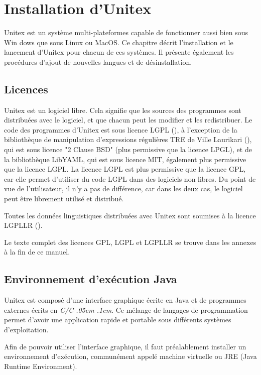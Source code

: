\chapter{Installation d'Unitex}
\label{chap-install}

Unitex est un système multi-plateformes capable de fonctionner aussi bien sous Win
dows que sous Linux ou MacOS. Ce chapitre décrit l’installation et le lancement d’Unitex
pour chacun de ces systèmes. Il présente également les procédures d’ajout de nouvelles
langues et de désinstallation.

\section{Licences}
\label{section-licences}
Unitex est un logiciel libre. Cela signifie que les sources des programmes sont distribuées avec le
logiciel, et que chacun peut les modifier et les redistribuer. Le code des programmes d’Unitex est
sous licence LGPL (\cite{LGPL}), à l’exception de la bibliothèque de manipulation d’expressions
régulières TRE de Ville Laurikari (\cite{TRE}), qui est sous licence "2 Clause BSD" (plus permissive que la licence LPGL), et
de la bibliothèque LibYAML, qui est sous licence MIT, également plus permissive que la licence LGPL.
La licence LGPL est plus permissive que la licence GPL, car elle permet d’utiliser du code LGPL dans
des logiciels non libres. Du point de vue de l’utilisateur, il n’y a pas de différence, car dans
les deux cas, le logiciel peut être librement utilisé et distribué.


\bigskip
\noindent Toutes les données linguistiques distribuées avec Unitex sont soumises à la licence LGPLLR
 (\cite{LGPLLR}).

\bigskip
\noindent Le texte complet des licences GPL, LGPL et LGPLLR se trouve dans les annexes à la fin de
ce manuel.

\section{Environnement d’exécution Java}
Unitex est composé d’une interface graphique écrite en Java et de programmes externes
écrits en \textit{C/C\kern-.05em\raisebox{.5ex}{++}\kern-.1em}. Ce mélange de langages de 
programmation permet d’avoir une application rapide et portable sous différents systèmes d’exploitation.


\bigskip
\noindent Afin de pouvoir utiliser l’interface graphique, il faut préalablement installer
un environnement d’exécution, communément appelé machine virtuelle  ou
JRE (Java Runtime Environment).

